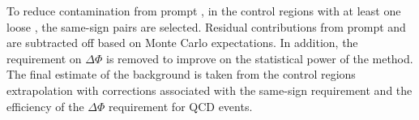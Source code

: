 To reduce contamination from prompt \tauTau, in the control regions with at least one loose \Tau, 
the same-sign pairs are selected.  Residual contributions from prompt
\tauTau and \wjets are subtracted off based on Monte Carlo expectations.
In addition, the requirement on $\Delta \Phi$
is removed to improve on the statistical power of the method. 
The final estimate of the background
is taken from the control regions extrapolation with corrections
associated with the same-sign requirement and the efficiency of 
the $\Delta \Phi$ requirement for QCD events.





